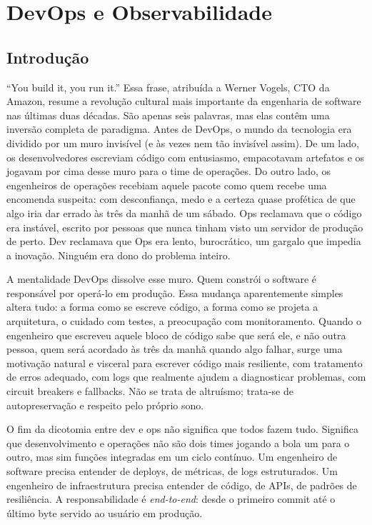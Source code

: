 \chapter{DevOps e Observabilidade}

\section{Introdução}

``You build it, you run it.'' Essa frase, atribuída a Werner Vogels, CTO da Amazon,
resume a revolução cultural mais importante da engenharia de software nas últimas
duas décadas. São apenas seis palavras, mas elas contêm uma inversão completa de
paradigma. Antes de DevOps, o mundo da tecnologia era dividido por um muro
invisível (e às vezes nem tão invisível assim). De um lado, os desenvolvedores
escreviam código com entusiasmo, empacotavam artefatos e os jogavam por cima
desse muro para o time de operações. Do outro lado, os engenheiros de operações
recebiam aquele pacote como quem recebe uma encomenda suspeita: com desconfiança,
medo e a certeza quase profética de que algo iria dar errado às três da manhã de
um sábado. Ops reclamava que o código era instável, escrito por pessoas que nunca
tinham visto um servidor de produção de perto. Dev reclamava que Ops era lento,
burocrático, um gargalo que impedia a inovação. Ninguém era dono do problema
inteiro.

A mentalidade DevOps dissolve esse muro. Quem constrói o software é responsável
por operá-lo em produção. Essa mudança aparentemente simples altera tudo: a forma
como se escreve código, a forma como se projeta a arquitetura, o cuidado com testes,
a preocupação com monitoramento. Quando o engenheiro que escreveu aquele bloco de
código sabe que será ele, e não outra pessoa, quem será acordado às três da
manhã quando algo falhar, surge uma motivação natural e visceral para escrever
código mais resiliente, com tratamento de erros adequado, com logs que realmente
ajudem a diagnosticar problemas, com circuit breakers e fallbacks. Não se trata de
altruísmo; trata-se de autopreservação e respeito pelo próprio sono.

O fim da dicotomia entre dev e ops não significa que todos fazem tudo. Significa que
desenvolvimento e operações não são dois times jogando a bola um para o outro, mas
sim funções integradas em um ciclo contínuo. Um engenheiro de software precisa
entender de deploys, de métricas, de logs estruturados. Um engenheiro de
infraestrutura precisa entender de código, de APIs, de padrões de resiliência.
A responsabilidade é \emph{end-to-end}: desde o primeiro commit até o último
byte servido ao usuário em produção.

